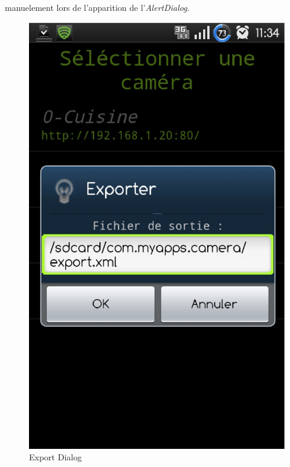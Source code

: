 manuelement lors de l'apparition de l'\textit{AlertDialog}.
\begin{figure}[H]
  \label{export}
  \centering
   \includegraphics[scale=0.4]{Images/export.eps}
  \caption{Export Dialog}
\end{figure}  

